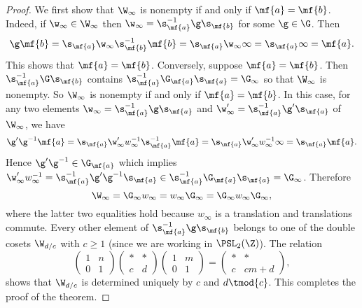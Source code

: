      \begin{proof}
        We first show that $\W_{\infty}$ is nonempty if and only if $\mf{a} = \mf{b}$. Indeed, if $\w_{\infty} \in \W_{\infty}$ then $\w_{\infty} = \s_{\mf{a}}^{-1}\g\s_{\mf{b}}$ for some $\g \in \G$. Then
        \[
          \g\mf{b} = \s_{\mf{a}}\w_{\infty}\s_{\mf{b}}^{-1}\mf{b} = \s_{\mf{a}}\w_{\infty}\infty = \s_{\mf{a}}\infty = \mf{a}.
        \]
        This shows that $\mf{a} = \mf{b}$. Conversely, suppose $\mf{a} = \mf{b}$. Then $\s_{\mf{a}}^{-1}\G\s_{\mf{b}}$ contains $\s_{\mf{a}}^{-1}\G_{\mf{a}}\s_{\mf{a}} = \G_{\infty}$ so that $\W_{\infty}$ is nonempty. So $\W_{\infty}$ is nonempty if and only if $\mf{a} = \mf{b}$. In this case, for any two elements $\w_{\infty} = \s_{\mf{a}}^{-1}\g\s_{\mf{a}}$ and $\w'_{\infty} = \s_{\mf{a}}^{-1}\g'\s_{\mf{a}}$ of $\W_{\infty}$, we have
        \[
          \g'\g^{-1}\mf{a} = \s_{\mf{a}}\w'_{\infty}w_{\infty}^{-1}\s_{\mf{a}}^{-1}\mf{a} = \s_{\mf{a}}\w'_{\infty}w_{\infty}^{-1}\infty = \s_{\mf{a}}\mf{a}.
        \]
        Hence $\g'\g^{-1} \in \G_{\mf{a}}$ which implies $\w'_{\infty}w_{\infty}^{-1} = \s_{\mf{a}}^{-1}\g'\g^{-1}\s_{\mf{a}} \in \s_{\mf{a}}^{-1}\G_{\mf{a}}\s_{\mf{a}} = \G_{\infty}$. Therefore
        \[
          \W_{\infty} = \G_{\infty}w_{\infty} = w_{\infty}\G_{\infty} = \G_{\infty}w_{\infty}\G_{\infty},
        \]
        where the latter two equalities hold because $w_{\infty}$ is a translation and translations commute. Every other element of $\s_{\mf{a}}^{-1}\g\s_{\mf{b}}$ belongs to one of the double cosets $\W_{d/c}$ with $c \ge 1$ (since we are working in $\PSL_{2}(\Z)$). The relation
        \[
          \begin{pmatrix} 1 & n \\ 0 & 1 \end{pmatrix}\begin{pmatrix} \ast & \ast \\ c & d \end{pmatrix}\begin{pmatrix} 1 & m \\ 0 & 1 \end{pmatrix} = \begin{pmatrix} \ast & \ast \\ c & cm+d \end{pmatrix},
        \]
        shows that $\W_{d/c}$ is determined uniquely by $c$ and $d \tmod{c}$. This completes the proof of the theorem.
      \end{proof}

